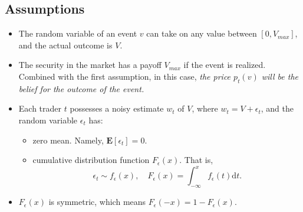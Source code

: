 \documentclass{article}
\begin{document}
        \subsection*{Assumptions}
        \begin{itemize}
            \item The random variable of an event $v$ can take on any value between $[0, V_{max}]$, and the actual outcome is $V$.
            \item The security in the market has a payoff $V_{max}$ if the event is realized. Combined with the first assumption, in this case, \textit{the price $p_t(v)$ will be the belief for the outcome of the event.}
            \item Each trader $t$ possesses a noisy estimate $w_t$ of $V$, where $w_t=V+\epsilon_t$, and the random variable $\epsilon_t$ has: \begin{itemize}[label=$\circ$]
                \item zero mean. Namely, $\mathbf{E}[\epsilon_t]=0$.
                \item cumulative distribution function $F_\epsilon(x)$. That is, \[ \epsilon_t\sim f_\epsilon(x),\quad F_\epsilon(x)=\int_{-\infty}^{x}f_\epsilon(t)\mathrm{d}t. \]
            \end{itemize}
            \item $F_\epsilon(x)$ is symmetric, which means $F_\epsilon(-x)=1-F_\epsilon(x)$.
        \end{itemize}
\end{document}
